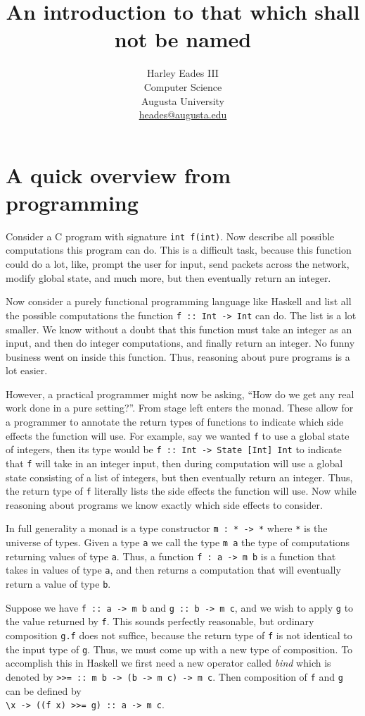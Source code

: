 \documentclass{article}
\title{An introduction to that which shall not be named}
\author{Harley Eades III\\Computer Science\\Augusta University\\\href{mailto:heades@augusta.edu}{heades@augusta.edu}}
\begin{document}
\maketitle

\section{A quick overview from programming}
\label{sec:a_quick_example_from_programming}
Consider a C program with signature \verb!int f(int)!.  Now describe
all possible computations this program can do.  This is a difficult
task, because this function could do a lot, like, prompt the user for
input, send packets across the network, modify global state, and much
more, but then eventually return an integer.

Now consider a purely functional programming language like Haskell
\cite{Haskell} and list all the possible computations the function
\verb!f :: Int -> Int! can do. The list is a lot smaller.  We know
without a doubt that this function must take an integer as an input,
and then do integer computations, and finally return an integer.  No
funny business went on inside this function.  Thus, reasoning about
pure programs is a lot easier.

However, a practical programmer might now be asking, ``How do we get
any real work done in a pure setting?''.  From stage left enters the
monad.  These allow for a programmer to annotate the return types of
functions to indicate which side effects the function will use.  For
example, say we wanted \verb!f! to use a global state of integers,
then its type would be \verb!f :: Int -> State [Int] Int! to indicate
that \verb!f! will take in an integer input, then during computation
will use a global state consisting of a list of integers, but then
eventually return an integer.  Thus, the return type of \verb!f!
  literally lists the side effects the function will use.  Now while
  reasoning about programs we know exactly which side effects to
  consider.

In full generality a monad is a type constructor \verb!m : * -> *!
where \verb!*! is the universe of types.  Given a type \verb!a! we
call the type \verb!m a! the type of computations returning values
of type \verb!a!.  Thus, a function \verb!f : a -> m b! is a function that
takes in values of type \verb!a!, and then returns a computation that
will eventually return a value of type \verb!b!.

Suppose we have \verb!f :: a -> m b! and \verb!g :: b -> m c!, and we
wish to apply \verb!g! to the value returned by \verb!f!. This sounds
perfectly reasonable, but ordinary composition \verb!g.f! does not
suffice, because the return type of \verb!f! is not identical to the
input type of \verb!g!.  Thus, we must come up with a new type of
composition.  To accomplish this in Haskell we first need a new
operator called \textit{bind} which is denoted by
\verb!>>= :: m b -> (b -> m c) -> m c!.  Then composition of \verb!f!
and \verb!g! can be defined by\\
\verb!\x -> ((f x) >>= g) :: a -> m c!.
\end{document}
